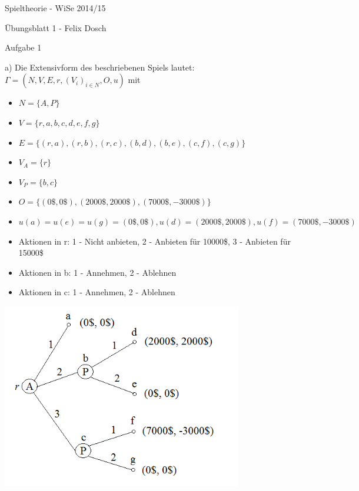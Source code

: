\documentclass{scrartcl}
\begin{document}
\begin{LARGE}
Spieltheorie - WiSe 2014/15
\end{LARGE}

\begin{Large}
Übungsblatt 1 - Felix Dosch\\[1.0cm]
\end{Large}

\begin{Large}
Aufgabe 1\\[0.0cm]
\end{Large}

a) Die Extensivform des beschriebenen Spiels lautet: $\Gamma = (N, V, E, r, (V_i)_{i \in N}, O, u)$ mit

\begin{itemize}
\item{$N = \{A, P\}$}
\item{$V = \{r, a, b, c, d, e, f, g\}$}
\item{$E = \{(r, a), (r, b), (r, c), (b, d), (b, e), (c, f), (c, g)\}$}
\item{$V_A = \{r\}$}
\item{$V_P = \{b, c\}$}
\item{$O = \{(0\$, 0\$), (2000\$, 2000\$), (7000\$, -3000\$)\}$}
\item{$u(a) = u(e) = u(g) = (0\$, 0\$), u(d) = (2000\$, 2000\$), u(f) = (7000\$, -3000\$)$}
\item{Aktionen in r: 1 - Nicht anbieten, 2 - Anbieten für 10000\$, 3 - Anbieten für 15000\$}
\item{Aktionen in b: 1 - Annehmen, 2 - Ablehnen}
\item{Aktionen in c: 1 - Annehmen, 2 - Ablehnen}
\end{itemize}
\includegraphics[width=10.5cm]{spielbaum_1a_fertig.png} \\
\end{document}
